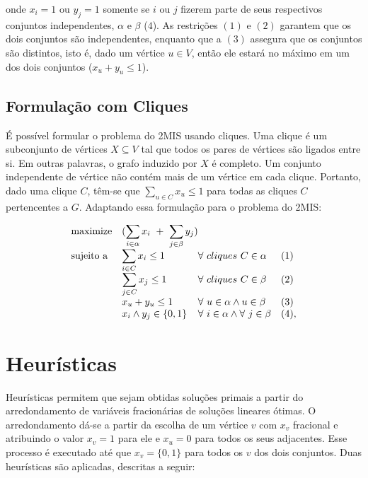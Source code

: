 \documentclass[12pt]{article}
\begin{document}
\noindent
onde $x_i = 1$ ou $y_j = 1$ somente se $i$ ou $j$ fizerem parte de seus respectivos conjuntos independentes, $\alpha$ e $\beta$ ($4$). As restrições $(1)$ e $(2)$ garantem que os dois conjuntos são independentes, enquanto que a $(3)$ assegura que os conjuntos são distintos, isto é, dado um vértice $u \in V$, então ele estará no máximo em um dos dois conjuntos ($x_u + y_u \leq 1$).

\subsection{Formulação com Cliques}

É possível formular o problema do 2MIS usando cliques. Uma clique é um subconjunto de vértices $X \subseteq V$ tal que todos os pares de vértices são ligados entre si. Em outras palavras, o grafo induzido por $X$ é completo. Um conjunto independente de vértice não contém mais de um vértice em cada clique. Portanto, dado uma clique $C$, têm-se que $\sum_{u \in C}x_u \leq 1$ para todas as cliques $C$ pertencentes a $G$. Adaptando essa formulação para o problema do 2MIS:

\begin{equation*}
\begin{array}{ll@{}ll}
\text{maximize}  & \displaystyle(\sum\limits_{i \in \alpha} x_{i}\ +\ \sum\limits_{j \in \beta}y_j)\\
\text{sujeito a }& \displaystyle \sum\limits_{i \in C} x_i \leq 1 &\forall \ cliques \ C \in \alpha & (1) \\
                 & \displaystyle \sum\limits_{j \in C} x_j \leq 1 &\forall \ cliques \ C \in \beta & (2) \\
                 & \displaystyle x_u + y_u \leq 1 &\forall \ u \in \alpha \wedge u \in \beta & (3)\\
                 & \displaystyle x_i \wedge y_j \in \{0,1\} &\forall \ i \in \alpha \wedge \forall \ j \in \beta & (4),
\end{array}
\end{equation*}

\section{Heurísticas}

Heurísticas permitem que sejam obtidas soluções primais a partir do arredondamento de variáveis fracionárias de soluções lineares ótimas. O arredondamento dá-se a partir da escolha de um vértice $v$ com $x_v$ fracional e atribuindo o valor $x_v = 1$ para ele e $x_u = 0$ para todos os seus adjacentes. Esse processo é executado até que $x_v = \{0, 1\}$ para todos os $v$ dos dois conjuntos. Duas heurísticas são aplicadas, descritas a seguir:
\end{document}
